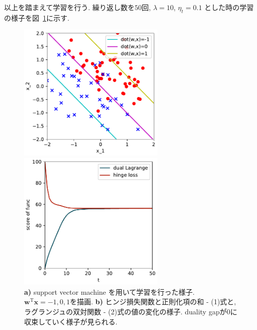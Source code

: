 \documentclass[a4paper,10pt]{jsarticle}
\begin{document}
以上を踏まえて学習を行う.
繰り返し数を$50$回, $\lambda=10$, $\eta_t = 0.1$ とした時の学習の様子を図~\ref{img:svm}に示す.
\begin{figure}[htbp]
 \begin{minipage}{0.5\hsize}
  \begin{center}
   \includegraphics[width=7cm]{figs/p3_svm_result.pdf}
  \end{center}
  \vspace{-0.5cm}
  \subcaption{}
 \end{minipage}
 \begin{minipage}{0.5\hsize}
  \begin{center}
   \includegraphics[width=7cm]{figs/p3_svm_gap.pdf}
  \end{center}
  \vspace{-0.5cm}
  \subcaption{}
 \end{minipage}
 \caption{\textbf{a)} support vector machine を用いて学習を行った様子.
 $\bm{w}^\mathrm{T}\bm{x}=-1,0,1$を描画.
 \textbf{b)} ヒンジ損失関数と正則化項の和 - (1)式と,
 ラグランジュの双対関数 - (2)式の値の変化の様子.
 duality gapが0に収束していく様子が見られる.}
 \label{img:svm}
\end{figure}
\end{document}

